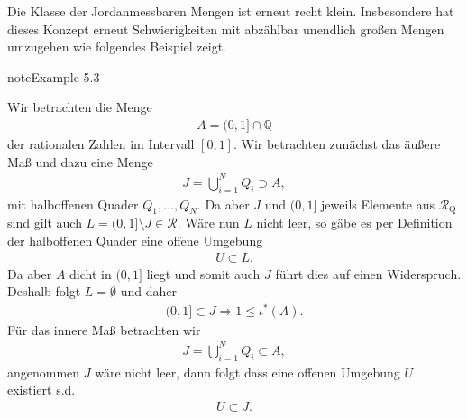 \documentclass[letterpaper,10pt,english]{jupyterBook}
\begin{document}
\sphinxAtStartPar
Die Klasse der Jordan\sphinxhyphen{}messbaren Mengen ist erneut recht klein. Insbesondere hat dieses Konzept erneut Schwierigkeiten mit abzählbar unendlich großen Mengen umzugehen wie folgendes Beispiel zeigt.
\label{masstheorie/masstheorie:ex:jordan}
\begin{sphinxadmonition}{note}{Example 5.3}



\sphinxAtStartPar
Wir betrachten die Menge
\begin{equation*}
\begin{split}A = (0,1]\cap \mathbb{Q}\end{split}
\end{equation*}
\sphinxAtStartPar
der rationalen Zahlen im Intervall \([0,1]\). Wir betrachten zunächst das äußere Maß und dazu eine Menge
\begin{equation*}
\begin{split}J = \bigcup_{i=1}^N Q_i \supset A,\end{split}
\end{equation*}
\sphinxAtStartPar
mit halboffenen Quader \(Q_1,\ldots,Q_N\). Da aber \(J\) und \((0,1]\) jeweils Elemente aus \(\mathcal{R}_{\text{Q}}\) sind gilt auch
\(L = (0,1]\setminus J \in\mathcal{R}\). Wäre nun \(L\) nicht leer, so gäbe es per Definition der halboffenen Quader eine offene Umgebung
\begin{equation*}
\begin{split}U\subset L.\end{split}
\end{equation*}
\sphinxAtStartPar
Da aber \(A\) dicht in \((0,1]\) liegt und somit auch \(J\) führt dies auf einen Widerspruch. Deshalb folgt \(L=\emptyset\) und daher
\begin{equation*}
\begin{split}(0,1]\subset J \Rightarrow 1\leq \iota^\ast(A).\end{split}
\end{equation*}
\sphinxAtStartPar
Für das innere Maß betrachten wir
\begin{equation*}
\begin{split}J = \bigcup_{i=1}^N Q_i \subset A,\end{split}
\end{equation*}
\sphinxAtStartPar
angenommen \(J\) wäre nicht leer, dann folgt dass eine offenen Umgebung \(U\) existiert s.d.
\begin{equation*}
\begin{split}U\subset J.\end{split}

\end{equation*}
\end{sphinxadmonition}
\end{document}
